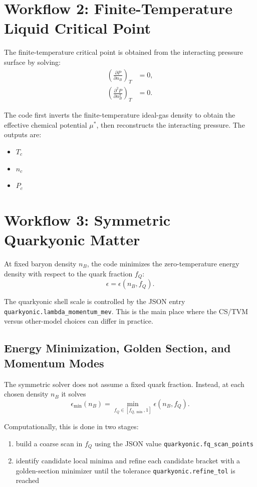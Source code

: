 \documentclass[11pt]{article}
\begin{document}
\section{Workflow 2: Finite-Temperature Liquid Critical Point}

The finite-temperature critical point is obtained from the interacting pressure
surface by solving:
\begin{align}
\left(\frac{\partial P}{\partial n_B}\right)_T &= 0, \\
\left(\frac{\partial^2 P}{\partial n_B^2}\right)_T &= 0.
\end{align}

The code first inverts the finite-temperature ideal-gas density to obtain the
effective chemical potential $\mu^\ast$, then reconstructs the interacting
pressure.  The outputs are:

\begin{itemize}
\item $T_c$
\item $n_c$
\item $P_c$
\end{itemize}

\section{Workflow 3: Symmetric Quarkyonic Matter}

At fixed baryon density $n_B$, the code minimizes the zero-temperature energy
density with respect to the quark fraction $f_Q$:
\begin{equation}
\epsilon = \epsilon(n_B, f_Q).
\end{equation}

The quarkyonic shell scale is controlled by the JSON entry
\texttt{quarkyonic.lambda\_momentum\_mev}.  This is the main place where the
CS/TVM versus other-model choices can differ in practice.

\subsection{Energy Minimization, Golden Section, and Momentum Modes}

The symmetric solver does not assume a fixed quark fraction.  Instead, at each
chosen density $n_B$ it solves
\begin{equation}
\epsilon_{\min}(n_B) = \min_{f_Q \in [f_{Q,\min},1]} \epsilon(n_B,f_Q).
\end{equation}

Computationally, this is done in two stages:
\begin{enumerate}
\item build a coarse scan in $f_Q$ using the JSON value
\texttt{quarkyonic.fq\_scan\_points}
\item identify candidate local minima and refine each candidate bracket with a
golden-section minimizer until the tolerance
\texttt{quarkyonic.refine\_tol} is reached
\end{enumerate}
\end{document}
